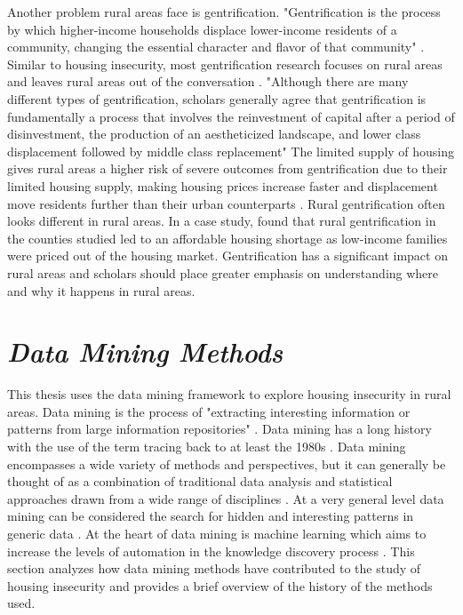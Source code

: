 Another problem rural areas face is gentrification. "Gentrification is the process by which higher-income households displace lower-income residents of a community, changing the essential character and flavor of that community" \citep[1]{yagley_they_2005}. Similar to housing insecurity, most gentrification research focuses on rural areas and leaves rural areas out of the conversation \citep{yagley_they_2005}. "Although there are many different types of gentrification, scholars generally agree that gentrification is fundamentally a process that involves the reinvestment of capital after a period of disinvestment, the production of an aestheticized landscape, and lower class displacement followed by middle class replacement" \citep[578]{bryson_nature_2013} The limited supply of housing gives rural areas a higher risk of severe outcomes from gentrification due to their limited housing supply, making housing prices increase faster and displacement move residents further than their urban counterparts \citep{golding_gentrification_2016}. Rural gentrification often looks different in rural areas. In a case study, \citet{yagley_they_2005} found that rural gentrification in the counties studied led to an affordable housing shortage as low-income families were priced out of the housing market. Gentrification has a significant impact on rural areas and scholars should place greater emphasis on understanding where and why it happens in rural areas. 

 

 

 

\section{\textit{Data Mining Methods}} 

 

This thesis uses the data mining framework to explore housing insecurity in rural areas. Data mining is the process of "extracting interesting information or patterns from large information repositories" \citep[1]{zhao_association_2003}. Data mining has a long history with the use of the term tracing back to at least the 1980s \citep{coenen_data_2011}. Data mining encompasses a wide variety of methods and perspectives, but it can generally be thought of as a combination of traditional data analysis and statistical approaches drawn from a wide range of disciplines \citep{jackson_data_2002}. At a very general level data mining can be considered the search for hidden and interesting patterns in generic data \citep{chen_comparisons_2011}. At the heart of data mining is machine learning which aims to increase the levels of automation in the knowledge discovery process \citep{jackson_data_2002}. This section analyzes how data mining methods have contributed to the study of housing insecurity and provides a brief overview of the history of the methods used.  

